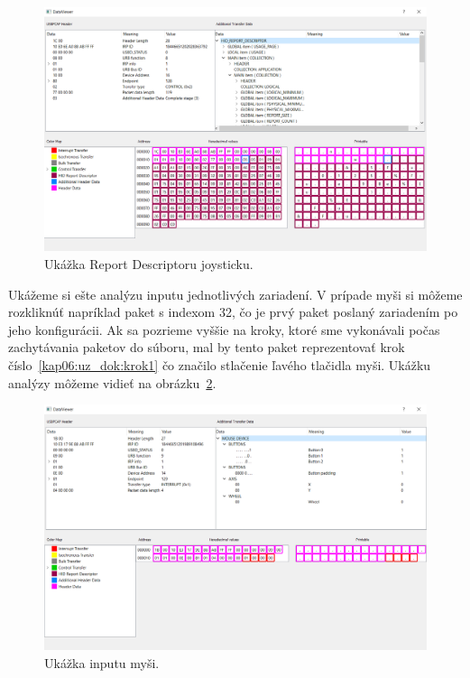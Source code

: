 \begin{figure}[!htb]
	\centering
	\includegraphics[width=\textwidth]{img/kap06_uk_report_desc}
	\caption{Ukážka Report Descriptoru joysticku.}
	\label{obr:kap6:uk_report_desc}
\end{figure}

Ukážeme si ešte analýzu inputu jednotlivých zariadení. V prípade myši si môžeme rozkliknúť napríklad paket s indexom 32, čo je prvý paket poslaný zariadením po jeho konfigurácii. Ak sa pozrieme vyššie na kroky, ktoré sme vykonávali počas zachytávania paketov do súboru, mal by tento paket reprezentovať krok číslo~\ref{kap06:uz_dok:krok1} čo značilo stlačenie ľavého tlačidla myši. Ukážku analýzy môžeme vidieť na obrázku~\ref{obr:kap6:uk_input_mouse}.

\begin{figure}[!htb]
	\centering
	\includegraphics[width=\textwidth]{img/kap06_uk_mouse}
	\caption{Ukážka inputu myši.}
	\label{obr:kap6:uk_input_mouse}
\end{figure}

